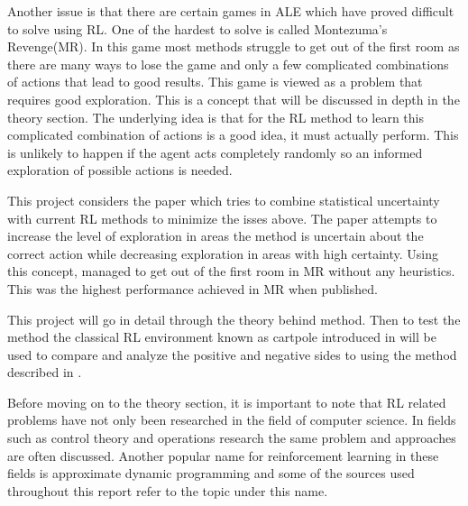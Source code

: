 Another issue is that there are certain games in ALE which have proved difficult to solve using RL. One of the hardest to solve is called Montezuma's Revenge(MR). In this game most methods struggle to get out of the first room as there are many ways to lose the game and only a few complicated combinations of actions that lead to good results. This game is viewed as a problem that requires good exploration. This is a concept that will be discussed in depth in the theory section. The underlying idea is that for the RL method to learn this complicated combination of actions is a good idea, it must actually perform. This is unlikely to happen if the agent acts completely randomly so an informed exploration of possible actions is needed.

This project considers the paper \cite{donoghue_2017} which tries to combine statistical uncertainty with current RL methods to minimize the isses above. The paper attempts to increase the level of exploration in areas the method is uncertain about the correct action while decreasing exploration in areas with high certainty. Using this concept, \cite{donoghue_2017} managed to get out of the first room in MR without any heuristics. This was the highest performance achieved in MR when published.

This project will go in detail through the theory behind \cite{donoghue_2017} method. Then to test the method the classical RL environment known as cartpole introduced in \cite{barto_sutton_1983} will be used to compare and analyze the positive and negative sides to using the method described in \cite{donoghue_2017}.

Before moving on to the theory section, it is important to note that RL related problems have not only been researched in the field of computer science. In fields such as control theory and operations research the same problem and approaches are often discussed. Another popular name for reinforcement learning in these fields is approximate dynamic programming and some of the sources used throughout this report refer to the topic under this name. \citep[p.~16]{powell_2011}

\cleardoublepage